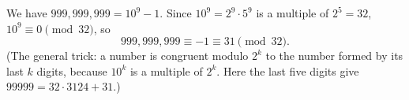 We have $999{,}999{,}999=10^9-1$. Since $10^9=2^9\cdot5^9$ is a multiple of $2^5=32$, $10^9\equiv0\pmod{32}$, so
\[
999{,}999{,}999\equiv-1\equiv\boxed{31}\pmod{32}.
\]
(The general trick: a number is congruent modulo $2^k$ to the number formed by its last $k$ digits, because $10^k$ is a multiple of $2^k$. Here the last five digits give $99999=32\cdot3124+31$.)
